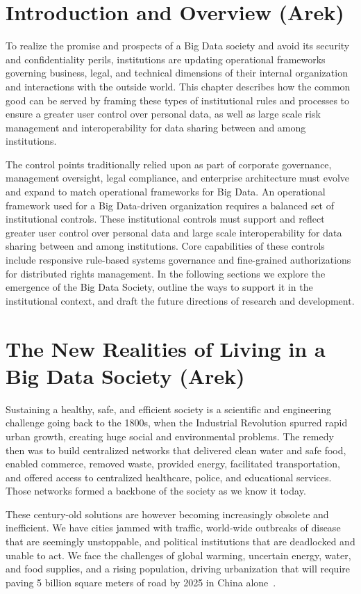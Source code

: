 \section{Introduction and Overview (Arek)}

To realize the promise and prospects of a Big Data society and avoid its security and confidentiality perils, institutions are updating operational frameworks governing business, legal, and technical dimensions of their internal organization and interactions with the outside world.  This chapter describes how the common good can be served by framing these types of institutional rules and processes to ensure a greater user control over personal data, as well as large scale risk management and interoperability for data sharing between and among institutions.

The control points traditionally relied upon as part of corporate governance, management oversight, legal compliance, and enterprise architecture must evolve and expand to match operational frameworks for Big Data.
An operational framework used for a Big Data-driven organization requires a balanced set of institutional controls.
These institutional controls must support and reflect greater user control over personal data and large scale interoperability for data sharing between and among institutions.
Core capabilities of these controls include responsive rule-based systems governance and fine-grained authorizations for distributed rights management.
In the following sections we explore the emergence of the Big Data Society, outline the ways to support it in the institutional context, and draft the future directions of research and development.

\section{The New Realities of Living in a Big Data Society (Arek)}

Sustaining a healthy, safe, and efficient society is a scientific and engineering challenge going back to the 1800s, when the Industrial Revolution spurred rapid urban growth, creating huge social and environmental problems.
The remedy then was to build centralized networks that delivered clean water and safe food, enabled commerce, removed waste, provided energy, facilitated transportation, and offered access to centralized healthcare, police, and educational services.
Those networks formed a backbone of the society as we know it today.

These century-old solutions are however becoming increasingly obsolete and inefficient.
We have cities jammed with traffic, world-wide outbreaks of disease that are seemingly unstoppable, and political institutions that are deadlocked and unable to act.
We face the challenges of global warming, uncertain energy, water, and food supplies, and a rising population, driving urbanization that will require paving 5 billion square meters of road by 2025 in China alone~\cite{cities2009}.

